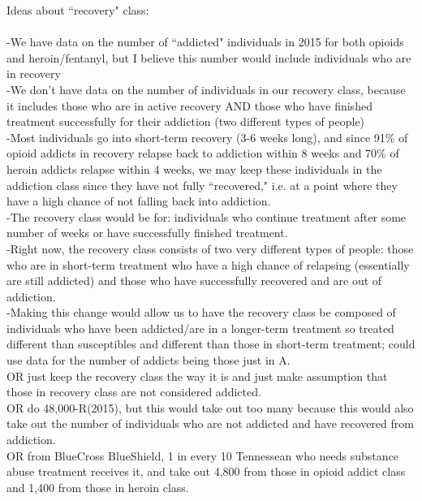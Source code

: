 \documentclass[12pt]{article}
\begin{document}
\noindent Ideas about ``recovery" class: \\ \\
-We have data on the number of ``addicted" individuals in 2015 for both opioids and heroin/fentanyl, but I believe this number would include individuals who are in recovery \\
-We don't have data on the number of individuals in our recovery class, because it includes those who are in active recovery AND those who have finished treatment successfully for their addiction (two different types of people)\\
-Most individuals go into short-term recovery (3-6 weeks long), and since 91\% of opioid addicts in recovery relapse back to addiction within 8 weeks and 70\% of heroin addicts relapse within 4 weeks, we may keep these individuals in the addiction class since they have not fully ``recovered," i.e. at a point where they have a high chance of not falling back into addiction. \\
-The recovery class would be for: individuals who continue treatment after some number of weeks or have successfully finished treatment. \\
-Right now, the recovery class consists of two very different types of people: those who are in short-term treatment who have a high chance of relapsing (essentially are still addicted) and those who have successfully recovered and are out of addiction. \\
-Making this change would allow us to have the recovery class be composed of individuals who have been addicted/are in a longer-term treatment so treated different than susceptibles and different than those in short-term treatment; could use data for the number of addicts being those just in A. \\

\noindent OR just keep the recovery class the way it is and just make assumption that those in recovery class are not considered addicted. \\

\noindent OR do 48,000-R(2015), but this would take out too many because this would also take out the number of individuals who are not addicted and have recovered from addiction. \\

\noindent OR from BlueCross BlueShield, 1 in every 10 Tennessean who needs substance abuse treatment receives it, and take out 4,800 from those in opioid addict class and 1,400 from those in heroin class. \\ %
\end{document}
